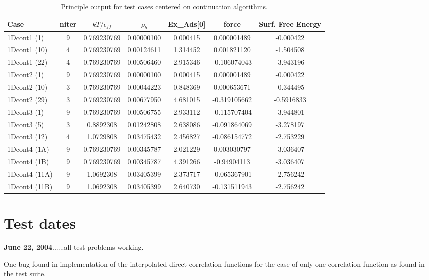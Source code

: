 \documentclass[10pt,onecolumn]{article}
\begin{document}
\begin{table}[h]\begin{tabular}{|l|c|c|c|c|c|c|}
\hline
Case & niter & $kT/\epsilon_{ff}$ &$\rho_b$ & Ex\_Ads[0]  & force & Surf. Free Energy  \\
\hline
1Dcont1 (1) & 9 & 0.769230769 &0.00000100 & 0.000415 & 0.000001489  & -0.000422   \\
1Dcont1 (10) & 4 &0.769230769 &0.00124611 & 1.314452 & 0.001821120  & -1.504508   \\
1Dcont1 (22) & 4 &0.769230769 &0.00506460 & 2.915346 & -0.106074043  & -3.943196  \\ \hline
1Dcont2 (1) & 9 &0.769230769 &0.00000100 & 0.000415 & 0.000001489  & -0.000422   \\
1Dcont2 (10) & 3 &0.769230769 &0.00044223 & 0.848369  & 0.000653671  & -0.344495   \\
1Dcont2 (29) & 3 &0.769230769 &0.00677950 & 4.681015 & -0.319105662  & -0.5916833  \\
 \hline
1Dcont3 (1) & 9 &0.769230769& 0.00506755 & 2.933112 & -0.115707404  & -3.944801   \\
1Dcont3 (5) & 3 &0.8892308 & 0.01242808 & 2.638086 & -0.091864069  & -3.278197   \\
1Dcont3 (12) & 4 &1.0729808 & 0.03475432 & 2.456827 & -0.086154772  & -2.753229 \\ \hline
1Dcont4 (1A) & 9 &0.769230769& 0.00345787 & 2.021229 & 0.003030797  & -3.036407   \\
1Dcont4 (1B) & 9 &0.769230769& 0.00345787 & 4.391266 & -0.94904113 &  -3.036407   \\
1Dcont4 (11A) & 9 &1.0692308& 0.03405399 & 2.373717 & -0.065367901  & -2.756242   \\
1Dcont4 (11B) & 9 &1.0692308& 0.03405399 & 2.640730 & -0.131511943  & -2.756242   \\
\hline
\end{tabular}
\label{tab:table_cont}
\caption{Principle output for test cases centered on continuation algorithms.}
\end{table}

\section{Test dates}

{\bf June 22, 2004}......all test problems working.
 
 One bug found in implementation of the interpolated direct correlation functions for the case of only one correlation function as found in the test suite.
\end{document}
